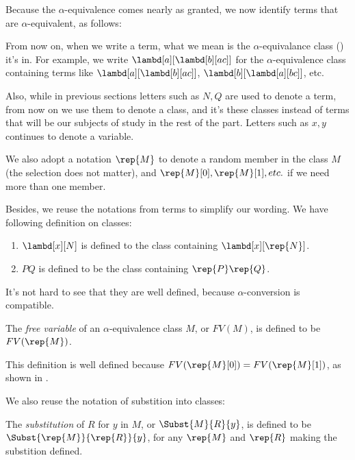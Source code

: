 \documentclass[../../../include/open-logic-section]{subfiles}
\begin{document}

Because the $\alpha$-equivalence comes nearly as granted, we now
identify terms that are $\alpha$-equivalent, as follows:

From now on, when we write a term, what we mean is the
$\alpha$-equivalance class () it's in. For
example, we write $\lambd[a][\lambd[b][a c]]$ for the
$\alpha$-equivalence class containing terms like
$\lambd[a][\lambd[b][a c]]$, $\lambd[b][\lambd[a][b c]]$, etc.

Also, while in previous sections letters such as $N, Q$ are used to
denote a term, from now on we use them to denote a class,
and it's these classes instead of terms that
will be our subjects of study in the rest of the part. Letters such as
$x, y$ continues to denote a variable.

We also adopt a notation $\rep{M}$ to denote a random member in the
class $M$ (the selection does not matter), and $\rep{M}[0], \rep{M}[1], etc. $ if we need more than
one member.

Besides, we reuse the notations from terms to simplify our wording. We
have following definition on classes:
\begin{defn}
  \begin{enumerate}
  \item $\lambd[x][N]$ is defined to the class containing
    $\lambd[x][\rep{N}]$.
  \item $PQ$ is defined to be the class containing $\rep{P}\rep{Q}$.
  \end{enumerate}
\end{defn}

It's not hard to see that they are well defined, because
$\alpha$-conversion is compatible.

\begin{defn} 
  The \emph{free variable} of an $\alpha$-equivalence class $M$, or $FV(M)$, is defined to be $FV(\rep{M})$.
\end{defn}

This definition is well defined because $FV(\rep{M}[0]) = FV(\rep{M}[1])$, as shown in .

We also reuse the notation of substition into classes:
\begin{defn} 
  The \emph{substitution} of $R$ for $y$ in $M$, or $\Subst{M}{R}{y}$, is
  defined to be $\Subst{\rep{M}}{\rep{R}}{y}$, for any $\rep{M}$ and
  $\rep{R}$ making the substition defined.
\end{defn}
\end{document}
